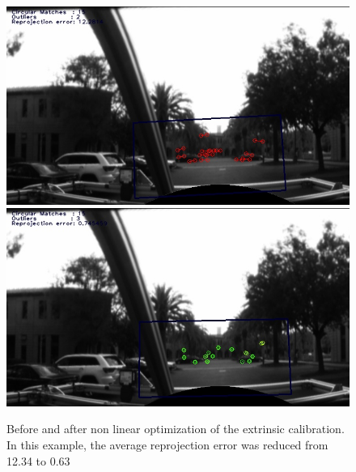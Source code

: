 \begin{figure}[h!]
  \centering
    \includegraphics[width=1.0\textwidth]{chapters/images/verify_before_opt}
    \includegraphics[width=1.0\textwidth]{chapters/images/verify_after_opt}
  \caption{Before and after non linear optimization of the extrinsic calibration.  In this example, the average reprojection error was reduced from 12.34 to 0.63}
  \label{fig:before_after_g2o}
\end{figure}